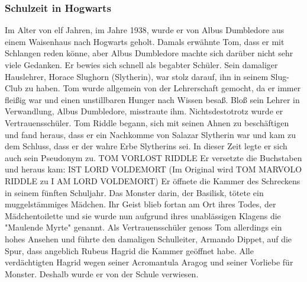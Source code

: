\documentclass[a4paper, 10pt]{article}
\begin{document}
\subsubsection*{\large Schulzeit in Hogwarts}
Im Alter von elf Jahren, im Jahre 1938, wurde er von Albus Dumbledore aus einem Waisenhaus nach Hogwarts geholt. Damals erwähnte Tom, dass er mit Schlangen reden könne, aber Albus Dumbledore machte sich darüber nicht sehr viele Gedanken. Er bewies sich schnell als begabter Schüler. Sein damaliger Hauslehrer, Horace Slughorn (Slytherin), war stolz darauf, ihn in seinem Slug-Club zu haben. Tom wurde allgemein von der Lehrerschaft gemocht, da er immer fleißig war und einen unstillbaren Hunger nach Wissen besaß. Bloß sein Lehrer in Verwandlung, Albus Dumbledore, misstraute ihm. Nichtsdestotrotz wurde er Vertrauensschüler.
\vspace{10pt}
\newline
{}  
Tom Riddle begann, sich mit seinen Ahnen zu beschäftigen und fand heraus, dass er ein Nachkomme von Salazar Slytherin war und kam zu dem Schluss, dass er der wahre Erbe Slytherins sei. In dieser Zeit legte er sich auch sein Pseudonym zu.
\vspace{10pt}
\newline
{}  
TOM VORLOST RIDDLE
\vspace{10pt}
\newline
{}  
Er versetzte die Buchstaben und heraus kam:
\vspace{10pt}
\newline
{}  
IST LORD VOLDEMORT
\vspace{10pt}
\newline
{}  
(Im Original wird TOM MARVOLO RIDDLE zu I AM LORD VOLDEMORT)
\vspace{10pt}
\newline
{}  
Er öffnete die Kammer des Schreckens in seinem fünften Schuljahr. Das Monster darin, der Basilisk, tötete ein muggelstämmiges Mädchen. Ihr Geist blieb fortan am Ort ihres Todes, der Mädchentoilette und sie wurde nun aufgrund ihres unablässigen Klagens die "Maulende Myrte" genannt. Als Vertrauensschüler genoss Tom allerdings ein hohes Ansehen und führte den damaligen Schulleiter, Armando Dippet, auf die Spur, dass angeblich Rubeus Hagrid die Kammer geöffnet habe. Alle verdächtigten Hagrid wegen seiner Acromantula Aragog und seiner Vorliebe für Monster. Deshalb wurde er von der Schule verwiesen.
\vspace{10pt}
\newline
\end{document}

